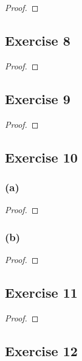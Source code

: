 \documentclass[14pt]{extarticle}
\begin{document}
\begin{proof}

\end{proof}

\subsection{Exercise 8}

\begin{proof}

\end{proof}

\subsection{Exercise 9}

\begin{proof}

\end{proof}

\subsection{Exercise 10}

\subsubsection{(a)}

\begin{proof}

\end{proof}

\subsubsection{(b)}

\begin{proof}

\end{proof}

\subsection{Exercise 11}

\begin{proof}

\end{proof}

\subsection{Exercise 12}
\end{document}
